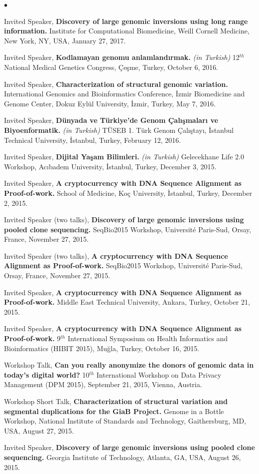 \documentclass[margin,line]{res}
\newenvironment{list2}{
  \begin{list}{$\bullet$}{%
      \setlength{\itemsep}{0in}
      \setlength{\parsep}{0in} \setlength{\parskip}{0in}
      \setlength{\topsep}{0in} \setlength{\partopsep}{0in} 
      \setlength{\leftmargin}{0.2in}}}{\end{list}}
\begin{document}
\begin{resume}
\begin{list2}
\item
  Invited Speaker, 
  {\bf Discovery of large genomic inversions using long range information.}
  Institute for Computational Biomedicine, Weill Cornell Medicine, New York, NY, USA, January 27, 2017.
\item
  Invited Speaker, 
  {\bf Kodlamayan genomu anlamlandırmak.} {\it (in Turkish)}
  12$^{th}$ National Medical Genetics Congress, Çeşme, Turkey, October 6, 2016.
\item
  Invited Speaker, 
  {\bf Characterization of structural genomic variation.}
  International Genomics and Bioinformatics Conference,
  İzmir Biomedicine and Genome Center, Dokuz Eylül University, İzmir, Turkey, May 7, 2016.
\item
  Invited Speaker,
  {\bf Dünyada ve Türkiye'de Genom Çalışmaları ve Biyoenformatik.} {\it (in Turkish)}
  TÜSEB 1. Türk Genom Çalıştayı, İstanbul Technical University, İstanbul, Turkey, February 12, 2016.
\item
  Invited Speaker,
  {\bf Dijital Yaşam Bilimleri.} {\it (in Turkish)}
  Gelecekhane Life 2.0 Workshop, Acıbadem University, \.{I}stanbul, Turkey, December 3, 2015.
\item
  Invited Speaker,
  {\bf A cryptocurrency with DNA Sequence Alignment as Proof-of-work.}
  School of Medicine, Ko\c{c} University, \.{I}stanbul, Turkey, December 2, 2015.
\item
  Invited Speaker (two talks), 
  {\bf Discovery of large genomic inversions using pooled clone sequencing.}
  SeqBio2015 Workshop, Université Paris-Sud, Orsay, France, November 27, 2015.
\item
  Invited Speaker (two talks), 
  {\bf A cryptocurrency with DNA Sequence Alignment as Proof-of-work.}
  SeqBio2015 Workshop, Université Paris-Sud, Orsay, France, November 27, 2015.
\item
  Invited Speaker,
  {\bf A cryptocurrency with DNA Sequence Alignment as Proof-of-work.}
  Middle East Technical University, Ankara, Turkey, October 21, 2015.
\item
  Invited Speaker,
  {\bf A cryptocurrency with DNA Sequence Alignment as Proof-of-work.}
  9$^{th}$ International Symposium on Health Informatics and Bioinformatics (HIBIT 2015),
   Muğla, Turkey, October 16, 2015.
  \clearpage
 \item
  Workshop Talk, 
  {\bf Can you really anonymize the donors of genomic data in today's digital world?}
  10$^{th}$ International Workshop on Data Privacy Management (DPM 2015), 
  September 21, 2015, Vienna, Austria.
\item
  Workshop Short Talk, 
  {\bf Characterization of structural variation and segmental duplications for the GiaB Project.}
  Genome in a Bottle Workshop, National Institute of Standards and Technology, Gaithersburg, MD, USA,
  August 27, 2015.
\item
  Invited Speaker, 
  {\bf Discovery of large genomic inversions using pooled clone sequencing.}
  Georgia Institute of Technology, Atlanta, GA, USA, August 26, 2015.


\end{list2}
\end{resume}
\end{document}
